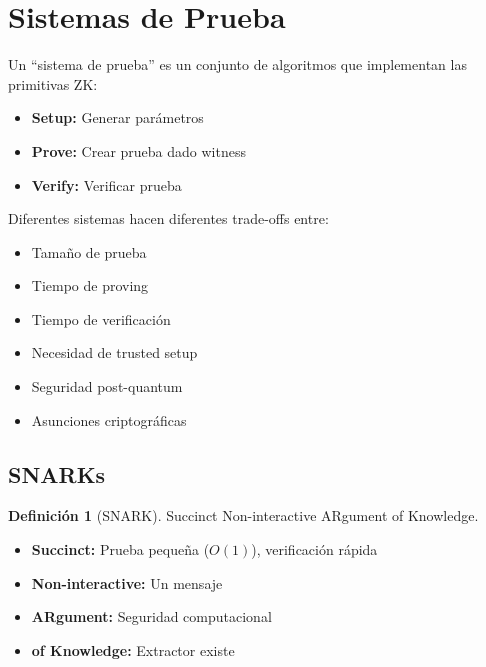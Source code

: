 \documentclass[11pt,a4paper,twoside,openright]{book}
\theoremstyle{definition}
\newtheorem{definition}{Definición}[chapter]
\theoremstyle{plain}
\theoremstyle{remark}
\begin{document}

\section{Sistemas de Prueba}

\begin{intuicion}
Un ``sistema de prueba'' es un conjunto de algoritmos que implementan las primitivas ZK:
\begin{itemize}
    \item \textbf{Setup:} Generar parámetros
    \item \textbf{Prove:} Crear prueba dado witness
    \item \textbf{Verify:} Verificar prueba
\end{itemize}

Diferentes sistemas hacen diferentes trade-offs entre:
\begin{itemize}
    \item Tamaño de prueba
    \item Tiempo de proving
    \item Tiempo de verificación
    \item Necesidad de trusted setup
    \item Seguridad post-quantum
    \item Asunciones criptográficas
\end{itemize}
\end{intuicion}

\subsection{SNARKs}

\begin{definition}[SNARK]
Succinct Non-interactive ARgument of Knowledge.
\end{definition}

\begin{itemize}
    \item \textbf{Succinct:} Prueba pequeña ($O(1)$), verificación rápida
    \item \textbf{Non-interactive:} Un mensaje
    \item \textbf{ARgument:} Seguridad computacional
    \item \textbf{of Knowledge:} Extractor existe
\end{itemize}
\end{document}
